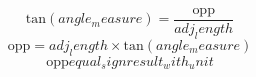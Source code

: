 \[\text{{tan}}({angle_measure})=\frac{{\text{{{opp}}}}}{{{adj_length}}}\]
\[\text{{{opp}}}={adj_length}\times \text{{tan}}({angle_measure})\]
\[\text{{{opp}}}{equal_sign}{result_with_unit}\]
